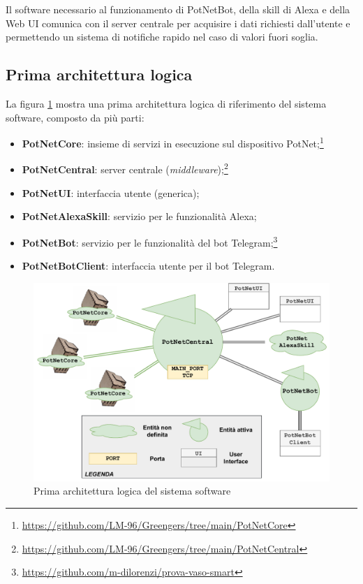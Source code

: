 Il software necessario al funzionamento di PotNetBot, della skill di Alexa e della Web UI comunica con il server centrale per acquisire i dati richiesti dall'utente e permettendo un sistema di notifiche rapido nel caso di valori fuori soglia. 

\newpage
\subsection{Prima architettura logica}

La figura \ref{fig:logical_arch} mostra una prima architettura logica di riferimento del sistema software, composto da più parti:
\begin{itemize}
	\item \textbf{PotNetCore}: insieme di servizi in esecuzione sul dispositivo PotNet;\footnote{\url{https://github.com/LM-96/Greengers/tree/main/PotNetCore}}
	
	\item \textbf{PotNetCentral}: server centrale (\textit{middleware});\footnote{\url{https://github.com/LM-96/Greengers/tree/main/PotNetCentral}}
	\item \textbf{PotNetUI}: interfaccia utente (generica);
	
	\item \textbf{PotNetAlexaSkill}: servizio per le funzionalità Alexa;
	
	\item \textbf{PotNetBot}: servizio per le funzionalità del bot Telegram;\footnote{\url{https://github.com/m-dilorenzi/prova-vaso-smart}}
	
	\item \textbf{PotNetBotClient}: interfaccia utente per il bot Telegram.
\end{itemize}

\begin{figure}[h]
	\centering
	\includegraphics[scale=0.8]{images/logical_arch.pdf}
	\caption{Prima architettura logica del sistema software}
	\label{fig:logical_arch}
\end{figure}

